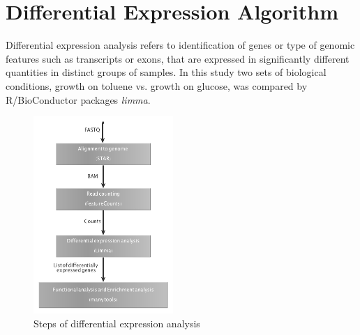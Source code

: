 \documentclass[12pt, a4paper]{report}
\begin{document}
\section{Differential Expression Algorithm}
Differential expression analysis refers to identification of genes or type of genomic features such as transcripts or exons, that are expressed in significantly different quantities in distinct groups of samples. In this study two sets of biological conditions, growth on toluene vs. growth on glucose, was compared by R/BioConductor packages \textit{limma}.\\

\begin{figure}[H]
	\centering	
	\includegraphics[width=150pt]{pics/diffgraph}
	\caption[Steps of differential expression analysis]
	{Steps of differential expression analysis}
\end{figure}
\end{document}

